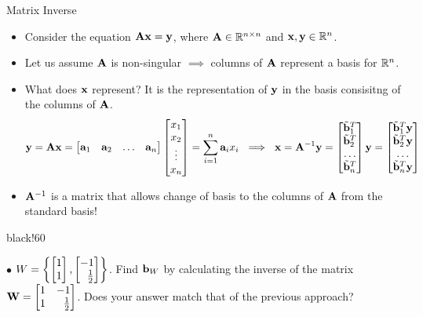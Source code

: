 \documentclass[aspectratio=169]{beamer}
\def\mf{\ensuremath\mathbf}
\def\mb{\ensuremath\mathbb}
\def\lc{\ensuremath\left\{}
\def\rc{\ensuremath\right\}}
\newcommand{\demoex}[2]{\onslide<#1->\begin{color}{black!60} #2 \end{color}}
\begin{document}
\begin{frame}[t]{Matrix Inverse}
\vspace{-0.25cm}
\begin{small}
\begin{itemize}
    \item Consider the equation $\mf{Ax} = \mf{y}$, where $\mf{A} \in \mb{R}^{n \times n}$ and $\mf{x}, \mf{y} \in \mb{R}^n$. 

    \item Let us assume $\mf{A}$ is non-singular $\implies$ columns of $\mf{A}$ represent a basis for $\mb{R}^n$.

    \item What does $\mf{x}$ represent? It is the representation of $\mf{y}$ in the basis consisitng of the columns of $\mf{A}$.
    \[ \mf{y} = \mf{Ax} = \begin{bmatrix*}\mf{a}_1 & \mf{a}_2 & \ldots & \mf{a}_n\end{bmatrix*}\begin{bmatrix*}x_1 \\ x_2 \\ \vdots \\ x_n\end{bmatrix*} = \sum_{i=1}^{n}\mf{a}_i x_i  \,\, \implies \,\, \mf{x} = \mf{A}^{-1}\mf{y} = \begin{bmatrix*}\tilde{\mf{b}}_1^T \\ \tilde{\mf{b}}_2^T \\ \ldots \\ \tilde{\mf{b}}_n^T\end{bmatrix*}\mf{y} = \begin{bmatrix*}\tilde{\mf{b}}_1^T\mf{y} \\ \tilde{\mf{b}}_2^T\mf{y} \\ \ldots \\ \tilde{\mf{b}}_n^T\mf{y}\end{bmatrix*} \]
    \item $\mf{A}^{-1}$ is a matrix that allows change of basis to the columns of $\mf{A}$ from the standard basis!
\end{itemize}
\end{small}

\demoex{2}{
\begin{footnotesize}
    $\bullet$ $W = \lc \begin{bmatrix*}[r]1\\1\end{bmatrix*}, \begin{bmatrix*}[r]-1\\\frac{1}{2}\end{bmatrix*} \rc$. Find $\mf{b}_W$ by calculating the inverse of the matrix $\mf{W} = \begin{bmatrix*}[r]1 & -1\\1 & \frac{1}{2}\end{bmatrix*}$. Does your answer match that of the previous approach? \vspace{0.2cm}


\end{footnotesize}}
\end{frame}
\end{document}
